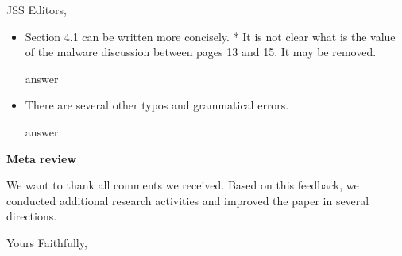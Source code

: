 \documentclass{letter}
\begin{document}
\begin{letter}{JSS Editors,}
\begin{itemize}
\item Section 4.1 can be written more concisely.
* It is not clear what is the value of the malware discussion between pages 13 and 15. It may be removed.


\vspace{0.2cm}

{\color{blue}{\bf Answer:} answer}

\vspace{0.2cm}

\item There are several other typos and grammatical errors.


\vspace{0.2cm}

{\color{blue}{\bf Answer:} answer}





\end{itemize}



{\bf Meta review}

We want to thank all comments we received. Based on this feedback, we conducted additional research activities and improved the paper in several directions.

\closing{Yours Faithfully,}


\end{letter}
\end{document}
